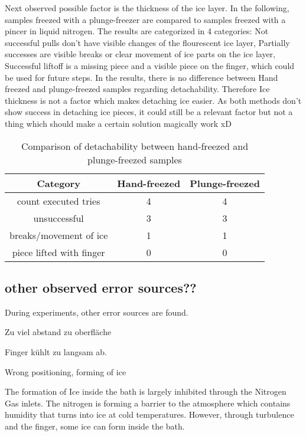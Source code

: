 Next observed possible factor is the thickness of the ice layer. In the following, samples freezed with a plunge-freezer are compared to samples freezed with a pincer in liquid nitrogen. The results are categorized in 4 categories: Not successful pulls don't have visible changes of the flourescent ice layer, Partially successes are visible breaks or clear movement of ice parts on the ice layer, Successful liftoff is a missing piece and a visible piece on the finger, which could be used for future steps. In the results, there is no difference between Hand freezed and plunge-freezed samples regarding detachability. Therefore Ice thickness is not a factor which makes detaching ice easier. As both methods don't show success in detaching ice pieces, it could still be a relevant factor but not a thing which should make a certain solution magically work xD

\begin{table}
	\centering
	\begin{tabular}{|c|c|c|}
		\hline
		Category & Hand-freezed & Plunge-freezed \\
		\hline
		\hline
		count executed tries & 4 & 4\\
		\hline
		unsuccessful & 3 & 3\\
		\hline
		breaks/movement of ice & 1 & 1\\
		\hline
		piece lifted with finger & 0 & 0\\
		\hline		
	\end{tabular}
	\caption{Comparison of detachability between hand-freezed and plunge-freezed samples}
\end{table}

\subsection{other observed error sources??}

During experiments, other error sources are found. 

Zu viel abstand zu oberfläche

Finger kühlt zu langsam ab.

Wrong positioning, forming of ice

The formation of Ice inside the bath is largely inhibited through the Nitrogen Gas inlets. The nitrogen is forming a barrier to the atmosphere which contains humidity that turns into ice at cold temperatures. However, through turbulence and the finger, some ice can form inside the bath. 

